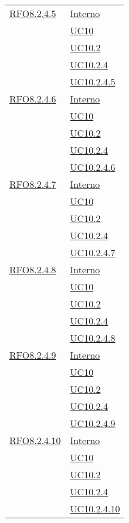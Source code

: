 \begin{longtable}{|>{\centering}m{5cm}|m{5cm}<{\centering}|}
 \hyperlink{RFO8.2.4.5}{RFO8.2.4.5} 
 & \hyperlink{Interno}{Interno}\\
 & \hyperref[UC10]{UC10}\\
 & \hyperref[UC10.2]{UC10.2}\\
 & \hyperref[UC10.2.4]{UC10.2.4}\\
 & \hyperref[UC10.2.4.5]{UC10.2.4.5}\\\hline
 
 \hyperlink{RFO8.2.4.6}{RFO8.2.4.6} 
 & \hyperlink{Interno}{Interno}\\
 & \hyperref[UC10]{UC10}\\
 & \hyperref[UC10.2]{UC10.2}\\
 & \hyperref[UC10.2.4]{UC10.2.4}\\
 & \hyperref[UC10.2.4.6]{UC10.2.4.6}\\\hline
 
 \hyperlink{RFO8.2.4.7}{RFO8.2.4.7} 
 & \hyperlink{Interno}{Interno}\\
 & \hyperref[UC10]{UC10}\\
 & \hyperref[UC10.2]{UC10.2}\\
 & \hyperref[UC10.2.4]{UC10.2.4}\\
 & \hyperref[UC10.2.4.7]{UC10.2.4.7}\\\hline
 
 \hyperlink{RFO8.2.4.8}{RFO8.2.4.8} 
 & \hyperlink{Interno}{Interno}\\
 & \hyperref[UC10]{UC10}\\
 & \hyperref[UC10.2]{UC10.2}\\
 & \hyperref[UC10.2.4]{UC10.2.4}\\
 & \hyperref[UC10.2.4.8]{UC10.2.4.8}\\\hline
 
 \hyperlink{RFO8.2.4.9}{RFO8.2.4.9} 
 & \hyperlink{Interno}{Interno}\\
 & \hyperref[UC10]{UC10}\\
 & \hyperref[UC10.2]{UC10.2}\\
 & \hyperref[UC10.2.4]{UC10.2.4}\\
 & \hyperref[UC10.2.4.9]{UC10.2.4.9}\\\hline
 
 \hyperlink{RFO8.2.4.10}{RFO8.2.4.10} 
 & \hyperlink{Interno}{Interno}\\
 & \hyperref[UC10]{UC10}\\
 & \hyperref[UC10.2]{UC10.2}\\
 & \hyperref[UC10.2.4]{UC10.2.4}\\
 & \hyperref[UC10.2.4.10]{UC10.2.4.10}\\\hline
  

\end{longtable}
